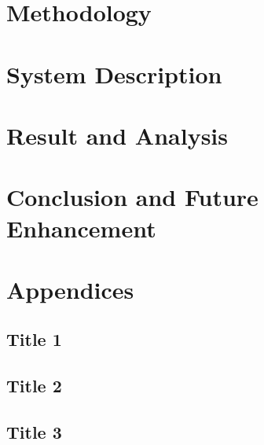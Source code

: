 \documentclass[a4paper, 12pt]{report}
\begin{document}
\chapter{Methodology}
\chapter{System Description}
\chapter{Result and Analysis}
\chapter{Conclusion and Future Enhancement}

\appendix
\chapter{Appendices}

\section{Title 1}
\section{Title 2}
\section{Title 3}




\end{document}
